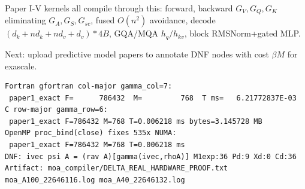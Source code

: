 \documentclass[11pt,a4paper]{article}
\begin{document}
Paper I-V kernels all compile through this: forward, backward $G_V,G_Q,G_K$ eliminating $G_A,G_S,G_{sc}$, fused $O(n^2)$ avoidance, decode $(d_k+nd_k+nd_v+d_v)*4B$, GQA/MQA $h_q/h_{kv}$, block RMSNorm+gated MLP.

Next: upload predictive model papers to annotate DNF nodes with cost $\beta M$ for exascale.


\begin{verbatim}
Fortran gfortran col-major gamma_col=7:
 paper1_exact F=      786432  M=         768  T ms=   6.21772837E-03
C row-major gamma_row=6:
 paper1_exact F=786432 M=768 T=0.006218 ms bytes=3.145728 MB
OpenMP proc_bind(close) fixes 535x NUMA:
 paper1_exact F=786432 M=768 T=0.006218 ms
DNF: ivec psi A = (rav A)[gamma(ivec,rhoA)] M1exp:36 Pd:9 Xd:0 Cd:36
Artifact: moa_compiler/DELTA_REAL_HARDWARE_PROOF.txt moa_A100_22646116.log moa_A40_22646132.log
\end{verbatim}
\end{document}
